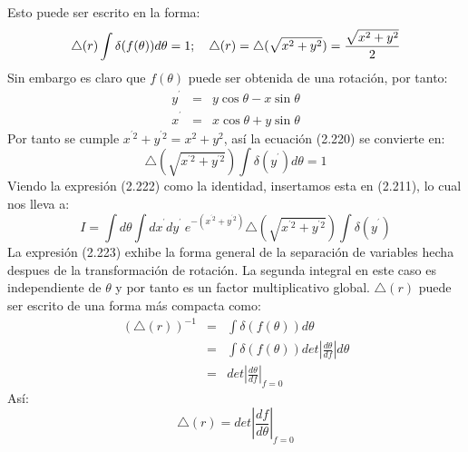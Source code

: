 Esto puede ser escrito en la forma:
\begin{equation}
\triangle(r)\int\delta(f(\theta))d\theta=1;\ \ \ \triangle(r)=\text{\ensuremath{\triangle}}(\sqrt{x^{2}+y^{2}})=\frac{\sqrt{x^{2}+y^{2}}}{2}
\end{equation}
Sin embargo es claro que $f(\theta)$ puede ser obtenida de una rotación, por tanto:
\begin{eqnarray}
\nonumber y^{^{\prime}}&=&y\cos \theta -x\sin \theta\\
x^{^{\prime}}&=&x\cos \theta +y\sin \theta 
\end{eqnarray}
Por tanto se cumple $x^{^{\prime} 2}+y^{^{\prime} 2}=x^2+y^2$, así la ecuación (2.220) se convierte en:
\begin{equation}
\triangle(\sqrt{x^{^{\prime}2}+y^{^{\prime}2}})\int\delta(y^{^{\prime}})d\theta=1
\end{equation}
Viendo la expresión (2.222) como la identidad, insertamos esta en (2.211), lo cual nos lleva a:
\begin{equation}
I=\int d\theta \int dx^{^{\prime}}dy^{^{\prime}}\ e^{-(x^{^{\prime} 2}+y^{^{\prime} 2})}\triangle(\sqrt{x^{^{\prime}2}+y^{^{\prime}2}})\int\delta(y^{^{\prime}})
\end{equation}
La expresión (2.223) exhibe la forma general de la separación de variables hecha despues de la transformación de rotación. La segunda integral en este caso es independiente de $\theta$ y por tanto es un factor multiplicativo global. $\triangle (r)$ puede ser escrito de una forma más compacta como:
\begin{eqnarray}
\nonumber (\triangle (r))^{-1}&=&\int \delta(f(\theta))d\theta \\
\nonumber &=& \int \delta(f(\theta))det|\frac{d\theta}{df}|d\theta\\
&=&det|\frac{d\theta}{df}|_{f=0}
\end{eqnarray}
Así:
\begin{equation}
\triangle (r)=det|\frac{df}{d\theta}|_{f=0}
\end{equation}
